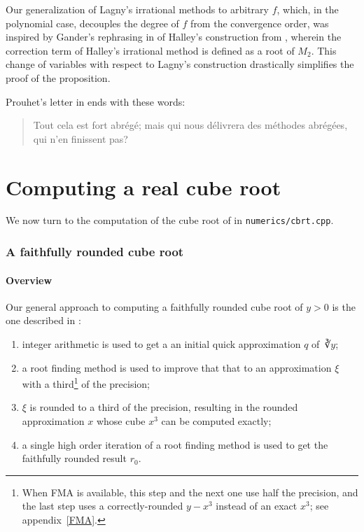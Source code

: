 ﻿\documentclass[10pt, a4paper, twoside]{basestyle}
\begin{document}
Our generalization of Lagny's irrational methods to arbitrary $f$, which, in the polynomial case,
decouples the degree of $f$ from the convergence order, was inspired by Gander's rephrasing in
\cite{Gander1985} of Halley's construction from \cite{Halley1694}, wherein the correction term of
Halley's irrational method is defined as a root of $M_2$. This change of variables with respect to
Lagny's construction drastically simplifies the proof of the proposition.

Prouhet’s letter in \cite{Cantor1861} ends with these words:
\begin{quote}\textfrench{%
Tout cela est fort abrégé; mais qui nous délivrera des méthodes abrégées,
qui n'en finissent pas?}\end{quote}

\part{Computing a real cube root}
\label{CubeRoot}

We now turn to the computation of the cube root of in \texttt{numerics/cbrt.cpp}.

\section*{A faithfully rounded cube root}
\subsection*{Overview}
Our general approach to computing a faithfully rounded cube root of $y>0$ is the one described in \cite{KahanBindel2001}:
\begin{enumerate}
\item integer arithmetic is used to get a an initial quick approximation $q$ of $\cuberoot y$;
\item a root finding method is used to improve that that to an approximation $ξ$ with a \cbstart{}third\footnote{When FMA is available,
this step and the next one use half the precision, and the last step uses a correctly-rounded $y-x^3$ instead of an
exact $x^3$; see appendix~\ref{FMA}.}\cbend{} of the precision;
\item $ξ$ is rounded to a third of the precision, resulting in the rounded approximation $x$ whose cube $x^3$ can be computed exactly;
\item a single high order iteration of a root finding method is used to get the faithfully rounded result $r_0$.
\end{enumerate} 
\end{document}
